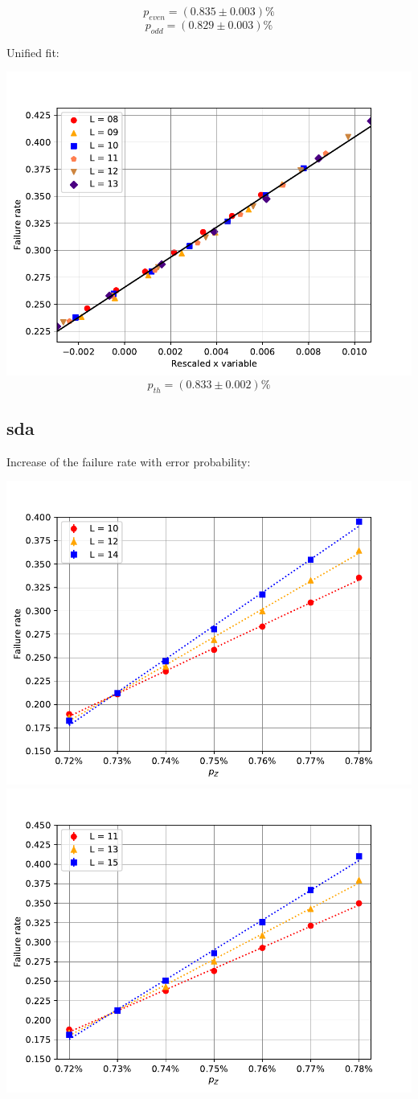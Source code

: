 \documentclass[pra]{revtex4-1}
\begin{document}
\[  p_{even} = (0.835 \pm 0.003)\% \]
\[  p_{odd} = (0.829 \pm 0.003)\% \]
\clearpage 

Unified fit: \begin{center} 

\includegraphics[width=.9\textwidth]{../graphs-paper2/rtw-dephasing-rescaled.pdf}
\[  p_{th} = (0.833 \pm 0.002)\% \] \end{center}
\clearpage 

\subsection*{sda}
\noindent Increase of the failure rate with error probability: 
  
\includegraphics[width=.49\textwidth]{../graphs-paper2/sda-dephasing-even.pdf}
\includegraphics[width=.49\textwidth]{../graphs-paper2/sda-dephasing-odd.pdf}
\end{document}
